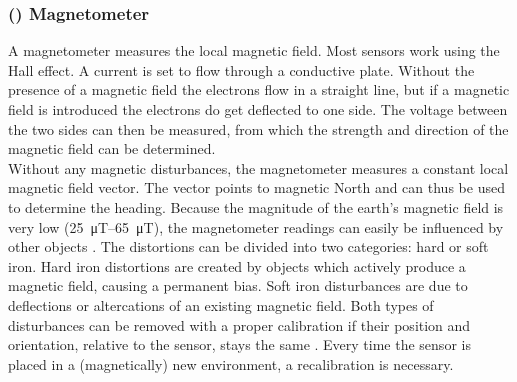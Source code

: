 \subsubsection{() Magnetometer}
A magnetometer measures the local magnetic field.
Most sensors work using the Hall effect.
A current is set to flow through a conductive plate.
Without the presence of a magnetic field the electrons flow in a straight line, but if a magnetic field is introduced the electrons do get deflected to one side.
The voltage between the two sides can then be measured, from which the strength and direction of the magnetic field can be determined.\\
Without any magnetic disturbances, the magnetometer measures a constant local magnetic field vector.
The vector points to magnetic North and can thus be used to determine the heading.
Because the magnitude of the earth's magnetic field is very low (\SIrange{25}{65}{\micro\tesla}), the magnetometer readings can easily be influenced by other objects \cite{Kok2016}.
The distortions can be divided into two categories: hard or soft iron.
Hard iron distortions are created by objects which actively produce a magnetic field, causing a permanent bias.
Soft iron disturbances are due to deflections or altercations of an existing magnetic field.
Both types of disturbances can be removed with a proper calibration if their position and orientation, relative to the sensor, stays the same \cite{Guo2008}.
Every time the sensor is placed in a (magnetically) new environment, a recalibration is necessary.

